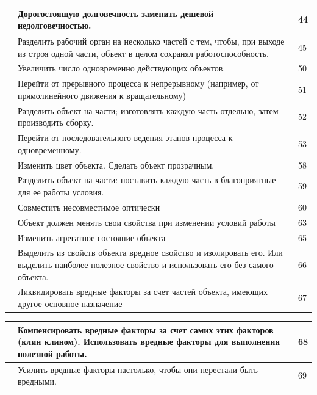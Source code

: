 \documentclass[11pt,a4paper]{article}
\begin{document}
\begin{center}
  \begin{tabular}{|p{}|p{}|p{}|}\hline
&Дорогостоящую долговечность заменить дешевой недолговечностью. & 44\\\hline
&Разделить рабочий орган на несколько частей с тем, чтобы, при выходе из строя
одной части, объект в целом сохранял работоспособность.  & 45\\\hline
&Увеличить число одновременно действующих объектов.  & 50\\\hline
&Перейти от прерывного процесса к непрерывному (например, от прямолинейного
движения к вращательному) & 51\\\hline
&Разделить объект на части; изготовлять каждую часть отдельно, затем
производить сборку. & 52\\\hline
&Перейти от последовательного ведения этапов процесса к одновременному. &
53\\\hline
&Изменить цвет объекта. Сделать объект прозрачным. & 58\\\hline
&Разделить объект на части: поставить каждую часть в благоприятные для ее
работы условия. & 59\\\hline
&Совместить несовместимое оптически & 60\\\hline
&Объект должен менять свои свойства при изменении условий работы & 63\\\hline
&Изменить агрегатное состояние объекта & 65\\\hline
&Выделить из свойств объекта вредное свойство и изолировать его. Или выделить
наиболее полезное свойство и использовать его без самого объекта. & 66\\\hline
&Ликвидировать вредные факторы за счет частей объекта, имеющих другое основное
назначение & 67\\\hline
  \end{tabular}

  \begin{tabular}{|p{}|p{}|p{}|}\hline
&Компенсировать вредные факторы за счет самих этих факторов (клин клином).
Использовать вредные факторы для выполнения полезной работы. & 68\\\hline
&Усилить вредные факторы настолько, чтобы они перестали быть вредными. &
69\\\hline
  \end{tabular}
\end{center}


\end{document}
